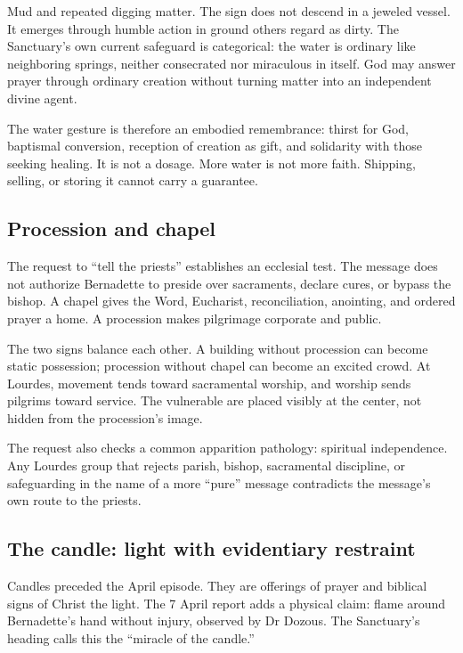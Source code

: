 Mud and repeated digging matter. The sign does not descend in a jeweled vessel. It emerges through humble action in ground others regard as dirty. The Sanctuary's own current safeguard is categorical: the water is ordinary like neighboring springs, neither consecrated nor miraculous in itself. God may answer prayer through ordinary creation without turning matter into an independent divine agent.

The water gesture is therefore an embodied remembrance: thirst for God, baptismal conversion, reception of creation as gift, and solidarity with those seeking healing. It is not a dosage. More water is not more faith. Shipping, selling, or storing it cannot carry a guarantee.

\subsection{Procession and chapel}

The request to “tell the priests” establishes an ecclesial test. The message does not authorize Bernadette to preside over sacraments, declare cures, or bypass the bishop. A chapel gives the Word, Eucharist, reconciliation, anointing, and ordered prayer a home. A procession makes pilgrimage corporate and public.

The two signs balance each other. A building without procession can become static possession; procession without chapel can become an excited crowd. At Lourdes, movement tends toward sacramental worship, and worship sends pilgrims toward service. The vulnerable are placed visibly at the center, not hidden from the procession's image.

The request also checks a common apparition pathology: spiritual independence. Any Lourdes group that rejects parish, bishop, sacramental discipline, or safeguarding in the name of a more “pure” message contradicts the message's own route to the priests.

\subsection{The candle: light with evidentiary restraint}

Candles preceded the April episode. They are offerings of prayer and biblical signs of Christ the light. The 7 April report adds a physical claim: flame around Bernadette's hand without injury, observed by Dr Dozous. The Sanctuary's heading calls this the “miracle of the candle.”

